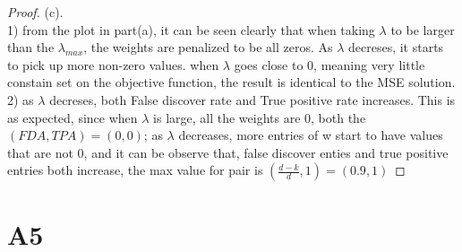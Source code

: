\documentclass[12pt]{article}
\begin{document}
\begin{proof}
        (c).\\

        1) from the plot in part(a), it can be seen clearly that when taking $\lambda$ to be larger than the $\lambda_{max}$, the weights are penalized to be all zeros. As $\lambda$ decreses, it starts to pick up more non-zero values. when $\lambda$ goes close to 0, meaning very little constain set on the objective function, the result is identical to the MSE solution.\\

        2) as $\lambda$ decreses, both False discover rate and True positive rate increases. This is as expected, since when $\lambda$ is large, all the weights are 0, both the $(FDA,TPA)  = (0,0)$; as $\lambda$ decreases, more entries of w start to have values that are not 0, and it can be observe that, false discover enties and true positive entries both increase, the max value for pair is $(\frac{d-k}{d}, 1) = (0.9, 1)$ 

\end{proof}

\newpage
\section*{A5}
\end{document}
